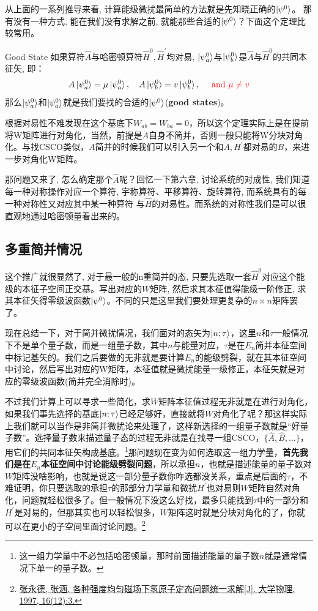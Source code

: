\documentclass[a4paper,zihao=-4,linespread=1]{ctexrep}
\begin{document}
    从上面的一系列推导来看, 计算能级微扰最简单的方法就是先知晓正确的$\ket{\psi^0}$。 那有没有一种方式, 能在我们没有求解之前, 就能那些合适的$\ket{\psi^0}$？下面这个定理比较常用。
    \begin{theorem}{Good State}
        如果算符$\hat A$与哈密顿算符$\hat{H}^0,\hat{H}^\prime$均对易, $\ket{\psi^0_a}$与$\ket{\psi^0_b}$是$\hat A$与$\hat{H}^0$的共同本征矢, 即：
        \[A \ket{\psi_a^0}=\mu \ket{\psi_a^0}, \quad A \ket{\psi_b^0}=v \ket{\psi_b^0}, \quad {\color{red}\text { and } \mu \neq v}\]
        那么$\ket{\psi_a^0}$和$\ket{\psi_a^0}$就是我们要找的合适的$\ket{\psi^0}$(\textbf{good states})。
    \end{theorem}

    根据对易性不难发现在这个基底下$W_{ab}=W_{ba}=0$，所以这个定理实际上是在提前将W矩阵进行对角化，当然，前提是$A$自身不简并，否则一般只能将W分块对角化。与找CSCO类似，$A$简并的时候我们可以引入另一个和$A,H^\prime$都对易的$B$，来进一步对角化W矩阵。

    那问题又来了, 怎么确定那个$\hat{A}$呢？回忆一下第六章, 讨论系统的对成性, 我们知道每一种对称操作对应一个算符, 宇称算符、平移算符、旋转算符, 而系统具有的每一种对称性又对应其中某一种算符
    与$\hat{H}$的对易性。而系统的对称性我们是可以很直观地通过哈密顿量看出来的。

    \subsection*{多重简并情况}
    这个推广就很显然了, 对于最一般的n重简并的态, 只要先选取一套$\hat{H}^0$对应这个能级的本征子空间正交基。写出对应的$W$矩阵, 然后求其本征值得能级一阶修正, 
    求其本征矢得零级波函数$\ket{\psi^0}$。不同的只是这里我们要处理更复杂的$n\times n$矩阵罢了。
    
    现在总结一下，对于简并微扰情况，我们面对的态矢为$\ket{n;\tau}$，这里$n$和$\tau$一般情况下不是单个量子数，而是一组量子数，其中$n$与能量对应，$\tau$是在$E_n$简并本征空间中标记基矢的。我们之后要做的无非就是要计算$E_n$的能级劈裂，就在其本征空间中讨论，然后写出对应的W矩阵，本征值就是微扰能量一级修正，本征矢就是对应的零级波函数(简并完全消除时)。
    
    不过我们计算上可以寻求一些简化，求$W$矩阵本征值过程无非就是在进行对角化，如果我们事先选择的基底$\ket{n;\tau}$已经足够好，直接就将$W$对角化了呢？那这样实际上我们就可以当作是非简并微扰论来处理了，这样新选择的一组量子数就是“好量子数”。选择量子数来描述量子态的过程无非就是在找寻一组CSCO，$\{\hat{A},\hat{B},\ldots \}$，用它们的共同本征矢构成基底。\footnote{这一组力学量中不必包括哈密顿量，那时前面描述能量的量子数$n$就是通常情况下单一的量子数。}那问题现在变为如何选取这一组力学量，\textbf{首先我们是在$E_n$本征空间中讨论能级劈裂问题}，所以承担$n$，也就是描述能量的量子数对$W$矩阵没啥影响，也就是说这一部分量子数你咋选都没关系，重点是后面的$\tau$，不难证明，你只要选取的承担$\tau$的那部分力学量和微扰$H^\prime$也对易则$W$矩阵自然对角化，问题就轻松很多了。但一般情况下没这么好找，最多只能找到$\tau$中的一部分和$H^\prime$是对易的，但那其实也可以轻松很多，$W$矩阵这时就是分块对角化的了，你就可以在更小的子空间里面讨论问题。\footnote{\href{http://www.cnki.com.cn/Article/CJFDTotal-DXWL712.001.htm}{张永德, 张涵. 各种强度均匀磁场下氢原子定态问题统一求解[J]. 大学物理, 1997, 16(12):3.}}
    
\end{document}
